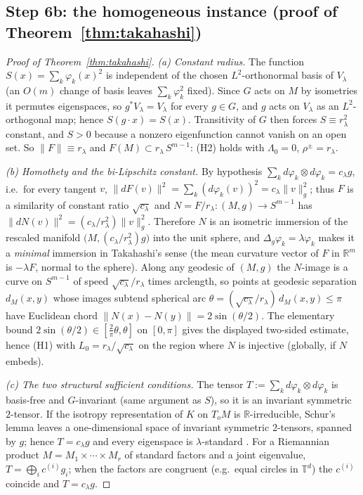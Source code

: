 \documentclass[11pt]{article}
\theoremstyle{remark}
\begin{document}
\subsection*{Step 6b: the homogeneous instance (proof of Theorem~\ref{thm:takahashi})}
\begin{proof}[Proof of Theorem~\ref{thm:takahashi}]
\emph{(a) Constant radius.} The function $S(x)=\sum_k\varphi_k(x)^2$ is
independent of the chosen $L^2$-orthonormal basis of $V_\lambda$ (an $O(m)$
change of basis leaves $\sum_k\varphi_k^2$ fixed). Since $G$ acts on $M$ by
isometries it permutes eigenspaces, so $g^*V_\lambda=V_\lambda$ for every
$g\in G$, and $g$ acts on $V_\lambda$ as an $L^2$-orthogonal map; hence
$S(g\cdot x)=S(x)$. Transitivity of $G$ then forces $S\equiv r_\lambda^2$
constant, and $S>0$ because a nonzero eigenfunction cannot vanish on an open set.
So $\lVert F\rVert\equiv r_\lambda$ and $F(M)\subset r_\lambda\,S^{m-1}$: (H2)
holds with $\Lambda_0=0$, $\rho^\pm=r_\lambda$.

\emph{(b) Homothety and the bi-Lipschitz constant.} By hypothesis
$\sum_k d\varphi_k\otimes d\varphi_k=c_\lambda g$, i.e.\ for every tangent $v$,
$\lVert dF(v)\rVert^2=\sum_k(d\varphi_k(v))^2=c_\lambda\lVert v\rVert_g^2$; thus
$F$ is a similarity of constant ratio $\sqrt{c_\lambda}$ and
$N=F/r_\lambda\colon(M,g)\to S^{m-1}$ has $\lVert dN(v)\rVert^2
=(c_\lambda/r_\lambda^2)\lVert v\rVert_g^2$. Therefore $N$ is an isometric
immersion of the rescaled manifold $\big(M,(c_\lambda/r_\lambda^2)g\big)$ into the
unit sphere, and $\Delta_g\varphi_k=\lambda\varphi_k$ makes it a \emph{minimal}
immersion in Takahashi's sense \cite{takahashi1966} (the mean curvature vector of
$F$ in $\mathbb R^m$ is $-\lambda F$, normal to the sphere). Along any geodesic of
$(M,g)$ the $N$-image is a curve on $S^{m-1}$ of speed $\sqrt{c_\lambda}/r_\lambda$
times arclength, so points at geodesic separation $d_M(x,y)$ whose images subtend
spherical arc $\theta=(\sqrt{c_\lambda}/r_\lambda)\,d_M(x,y)\le\pi$ have Euclidean
chord $\lVert N(x)-N(y)\rVert=2\sin(\theta/2)$. The elementary bound
$2\sin(\theta/2)\in[\tfrac2\pi\theta,\theta]$ on $[0,\pi]$ gives the displayed
two-sided estimate, hence (H1) with $L_0=r_\lambda/\sqrt{c_\lambda}$ on the region
where $N$ is injective (globally, if $N$ embeds).

\emph{(c) The two structural sufficient conditions.} The tensor
$T:=\sum_k d\varphi_k\otimes d\varphi_k$ is basis-free and $G$-invariant (same
argument as $S$), so it is an invariant symmetric $2$-tensor. If the isotropy
representation of $K$ on $T_oM$ is $\mathbb R$-irreducible, Schur's lemma leaves a
one-dimensional space of invariant symmetric $2$-tensors, spanned by $g$; hence
$T=c_\lambda g$ and every eigenspace is $\lambda$-standard \cite{wolf1968}. For a
Riemannian product $M=M_1\times\cdots\times M_r$ of standard factors and a joint
eigenvalue, $T=\bigoplus_i c^{(i)}g_i$; when the factors are congruent (e.g.\
equal circles in $\mathbb T^d$) the $c^{(i)}$ coincide and $T=c_\lambda g$.


\end{proof}
\end{document}
